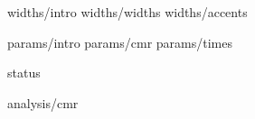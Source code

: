 \documentclass[twocolumn]{article}
\def\inputsect#1{\let\sectionname#1}
\begin{document}
\inputsect\section widths/intro
\inputsect\subsection widths/widths
\inputsect\subsection widths/accents


\inputsect\section params/intro
\inputsect\subsection params/cmr
\inputsect\subsection params/times

\inputsect\section status

\setcounter{section}{0}

\inputsect\section analysis/cmr
\end{document}
